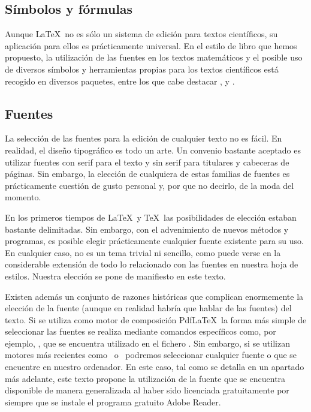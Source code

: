 \subsection{Símbolos y fórmulas}
Aunque \LaTeX\ no es sólo un sistema de edición para textos científicos, su aplicación para ellos es prácticamente universal. En el estilo de libro que hemos propuesto, la utilización de las fuentes en los textos matemáticos y el posible uso de diversos símbolos y herramientas propias para los textos científicos está recogido en diversos paquetes, entre los que cabe destacar ,  y .

\subsection{Fuentes}
La selección de las fuentes para la edición de cualquier texto no es fácil. En realidad, el diseño tipográfico es todo un arte. Un convenio bastante aceptado es utilizar fuentes con serif para el texto y sin serif para titulares y cabeceras de páginas. Sin embargo, la elección de cualquiera de estas familias de fuentes es prácticamente cuestión de gusto personal y, por que no decirlo, de la moda del momento.

En los primeros tiempos de \LaTeX\ y \TeX\ las posibilidades de elección estaban bastante delimitadas. Sin embargo, con el advenimiento de nuevos métodos y programas, es posible elegir prácticamente cualquier fuente existente para su uso. En cualquier caso, no es un tema trivial ni sencillo, como puede verse en la considerable extensión de todo lo relacionado con las fuentes en nuestra hoja de estilos. Nuestra elección se pone de manifiesto en este texto.

Existen además un conjunto de razones históricas que complican enormemente la elección de la fuente (aunque en realidad habría que hablar de las fuentes) del texto. Si se utiliza como motor de composición Pdf\LaTeX\, la forma más simple de seleccionar las fuentes se realiza mediante comandos específicos como, por ejemplo,  , que se encuentra utilizado en el fichero .  Sin embargo, si se utilizan motores más recientes como \XeLaTeX\ o \LuaLaTeX\, podremos seleccionar cualquier fuente  o  que se encuentre en nuestro ordenador. En este caso, tal  como se detalla en un apartado más adelante, este texto propone la utilización de la fuente  que se encuentra disponible de manera generalizada al haber sido licenciada gratuitamente por \tsp{\textregistered} siempre que se instale el programa gratuito Adobe Reader. 

